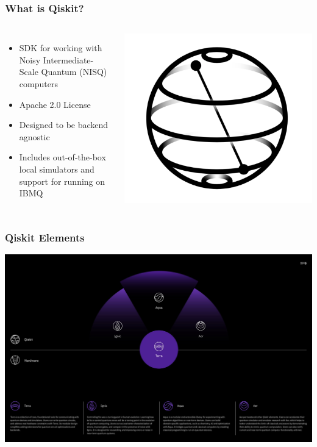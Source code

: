 \documentclass[aspectratio=169,11pt,hyperref={colorlinks=true}]{beamer}
\begin{document}
\begin{frame}
    \frametitle{What is Qiskit?}
    \begin{columns}
            \begin{itemize}
                \item SDK for working with Noisy Intermediate-Scale Quantum (NISQ) computers
                \item Apache 2.0 License
                \item Designed to be backend agnostic
                \item Includes out-of-the-box local simulators and support for running on IBMQ
            \end{itemize}
            \includegraphics[width=\textwidth]{qiskit_logo.png}
    \end{columns}
\end{frame}

\begin{frame}
    \frametitle{Qiskit Elements}
    \centering
    \includegraphics[width=.9\textwidth]{qiskit-components.jpeg}
\end{frame}
\end{document}
